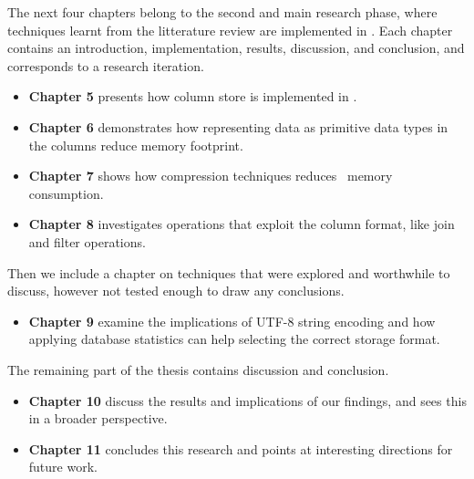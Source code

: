 
The next four chapters belong to the second and main research phase, where techniques learnt from the litterature review are implemented in \gap. Each chapter contains an introduction, implementation, results, discussion, and conclusion, and corresponds to a research iteration. 
\begin{itemize}
    \item \textbf{Chapter 5} presents how column store is implemented in \gap.
    \item \textbf{Chapter 6} demonstrates how representing data as primitive data types in the columns reduce memory footprint.
    \item \textbf{Chapter 7} shows how compression techniques reduces \gap~memory consumption.
    \item \textbf{Chapter 8} investigates operations that exploit the column format, like join and filter operations.
\end{itemize}

Then we include a chapter on techniques that were explored and worthwhile to discuss, however not tested enough to draw any conclusions.

\begin{itemize}
    \item \textbf{Chapter 9} examine the implications of UTF-8 string encoding and how applying database statistics can help selecting the correct storage format.
\end{itemize}

The remaining part of the thesis contains discussion and conclusion.
\begin{itemize}
  \item \textbf{Chapter 10} discuss the results and implications of our findings, and sees this in a broader perspective. 
  \item \textbf{Chapter 11} concludes this research and points at interesting directions for future work.
\end{itemize}



